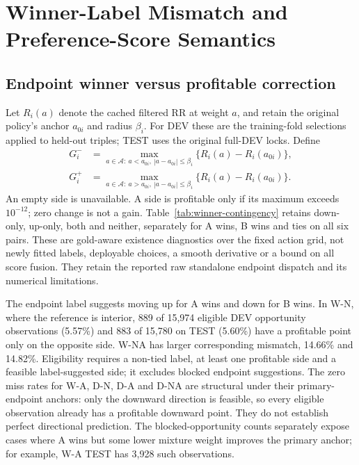\documentclass[11pt,a4paper]{article}
\newcommand{\Agrid}{\mathcal{A}}
\begin{document}
\section{Winner-Label Mismatch and Preference-Score Semantics}
\label{app:winner-signal}

\subsection{Endpoint winner versus profitable correction}
Let $R_i(a)$ denote the cached filtered RR at weight $a$, and retain the original policy's anchor $a_{0i}$ and radius $\beta_i$. For DEV these are the training-fold selections applied to held-out triples; TEST uses the original full-DEV locks. Define
\begin{align}
G_i^-&=\max_{a\in\Agrid:\ a<a_{0i},\ |a-a_{0i}|\leq\beta_i}\{R_i(a)-R_i(a_{0i})\},\\
G_i^+&=\max_{a\in\Agrid:\ a>a_{0i},\ |a-a_{0i}|\leq\beta_i}\{R_i(a)-R_i(a_{0i})\}.
\label{eq:winner-direction}
\end{align}
An empty side is unavailable. A side is profitable only if its maximum exceeds $10^{-12}$; zero change is not a gain. Table~\ref{tab:winner-contingency} retains down-only, up-only, both and neither, separately for A wins, B wins and ties on all six pairs. These are gold-aware existence diagnostics over the fixed action grid, not newly fitted labels, deployable choices, a smooth derivative or a bound on all score fusion. They retain the reported raw standalone endpoint dispatch and its numerical limitations.



The endpoint label suggests moving up for A wins and down for B wins. In W-N, where the reference is interior, 889 of 15,974 eligible DEV opportunity observations (5.57\%) and 883 of 15,780 on TEST (5.60\%) have a profitable point only on the opposite side. W-NA has larger corresponding mismatch, 14.66\% and 14.82\%. Eligibility requires a non-tied label, at least one profitable side and a feasible label-suggested side; it excludes blocked endpoint suggestions. The zero miss rates for W-A, D-N, D-A and D-NA are structural under their primary-endpoint anchors: only the downward direction is feasible, so every eligible observation already has a profitable downward point. They do not establish perfect directional prediction. The blocked-opportunity counts separately expose cases where A wins but some lower mixture weight improves the primary anchor; for example, W-A TEST has 3,928 such observations.
\end{document}
